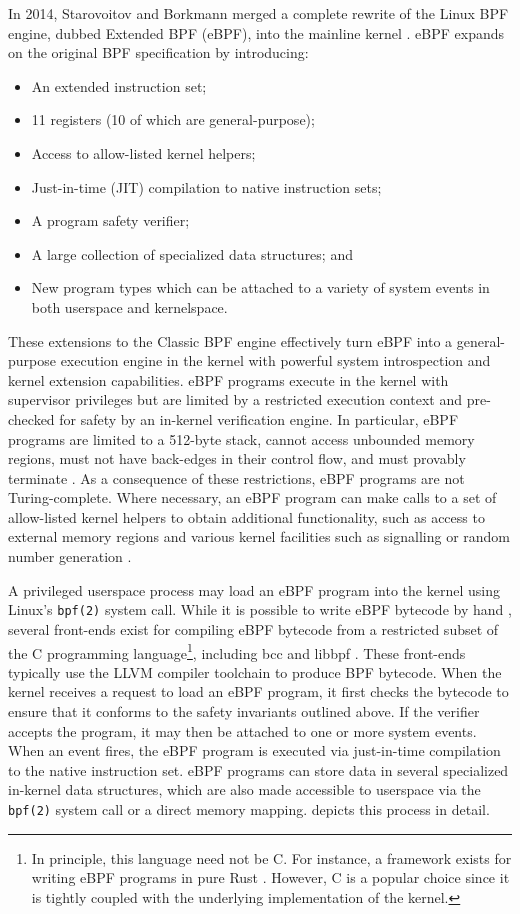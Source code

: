 In 2014, Starovoitov and Borkmann merged a complete rewrite of the Linux BPF engine, dubbed Extended BPF (eBPF), into the mainline kernel \cite{starovoitov2014_ebpf}. eBPF expands on the original BPF specification by introducing:
\begin{itemize}
  \item An extended instruction set;
  \item 11 registers (10 of which are general-purpose);
  \item Access to allow-listed kernel helpers;
  \item Just-in-time (JIT) compilation to native instruction sets;
  \item A program safety verifier;
  \item A large collection of specialized data structures; and
  \item New program types which can be attached to a variety of system events in both userspace and kernelspace.
\end{itemize}
These extensions to the Classic BPF engine effectively turn eBPF into a general-purpose execution engine in the kernel with powerful system introspection and kernel extension capabilities. eBPF programs execute in the kernel with supervisor privileges but are limited by a restricted execution context and pre-checked for safety by an in-kernel verification engine. In particular, eBPF programs are limited to a 512-byte stack, cannot access unbounded memory regions, must not have back-edges in their control flow, and must provably terminate \cite{gregg2019_bpf}. As a consequence of these restrictions, eBPF programs are not Turing-complete. Where necessary, an eBPF program can make calls to a set of allow-listed kernel helpers to obtain additional functionality, such as access to external memory regions and various kernel facilities such as signalling or random number generation \cite{gregg2019_bpf}.

A privileged userspace process may load an eBPF program into the kernel using Linux's \texttt{bpf(2)} system call. While it is possible to write eBPF bytecode by hand \cite{gregg2019_bpf}, several front-ends exist for compiling eBPF bytecode from a restricted subset of the C programming language\footnote{In principle, this language need not be C. For instance, a framework exists for writing eBPF programs in pure Rust . However, C is a popular choice since it is tightly coupled with the underlying implementation of the kernel.}, including bcc \cite{bcc} and libbpf \cite{libbpf}. These front-ends typically use the LLVM \cite{llvm_bpf} compiler toolchain to produce BPF bytecode. When the kernel receives a request to load an eBPF program, it first checks the bytecode to ensure that it conforms to the safety invariants outlined above. If the verifier accepts the program, it may then be attached to one or more system events. When an event fires, the eBPF program is executed via just-in-time compilation to the native instruction set. eBPF programs can store data in several specialized in-kernel data structures, which are also made accessible to userspace via the \texttt{bpf(2)} system call or a direct memory mapping.  depicts this process in detail.

